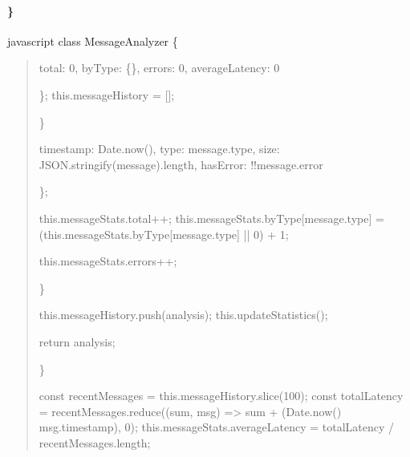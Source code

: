 \documentclass[letterpaper,10pt,english]{sphinxmanual}
\begin{document}
\paragraph{\}}
\label{\detokenize{api/websocket-api:id179}}
\sphinxAtStartPar
{}
{\color{red}\bfseries{}\textasciigrave{}\textasciigrave{}}{\color{red}\bfseries{}\textasciigrave{}}javascript
class MessageAnalyzer \{
\begin{quote}
\begin{description}
\begin{description}
\sphinxAtStartPar
total: 0,
byType: \{\},
errors: 0,
averageLatency: 0

\end{description}

\sphinxAtStartPar
\};
this.messageHistory = {[}{]};

\end{description}

\sphinxAtStartPar
\}
\begin{description}
\begin{description}
\sphinxAtStartPar
timestamp: Date.now(),
type: message.type,
size: JSON.stringify(message).length,
hasError: !!message.error

\end{description}

\sphinxAtStartPar
\};

\sphinxAtStartPar
this.messageStats.total++;
this.messageStats.byType{[}message.type{]} = (this.messageStats.byType{[}message.type{]} || 0) + 1;
\begin{description}
\sphinxAtStartPar
this.messageStats.errors++;

\end{description}

\sphinxAtStartPar
\}

\sphinxAtStartPar
this.messageHistory.push(analysis);
this.updateStatistics();

\sphinxAtStartPar
return analysis;

\end{description}

\sphinxAtStartPar
\}
\begin{description}
\begin{description}
\sphinxAtStartPar
const recentMessages = this.messageHistory.slice(\sphinxhyphen{}100);
const totalLatency = recentMessages.reduce((sum, msg) =\textgreater{} sum + (Date.now() \sphinxhyphen{} msg.timestamp), 0);
this.messageStats.averageLatency = totalLatency / recentMessages.length;


\end{description}
\end{description}
\end{quote}
\end{document}
